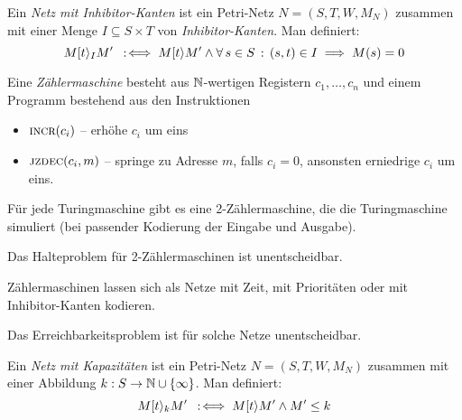 \documentclass{cheat-sheet}
\newcommand{\activeTransition}[1]{[{#1}\rangle} %
\begin{document}

\begin{defn}
  Ein \emph{Netz mit Inhibitor-Kanten} ist ein Petri-Netz $N = (S, T, W, M_N)$ zusammen mit einer Menge $I \subseteq S \times T$ von \textit{Inhibitor-Kanten}.
  Man definiert:
  \[
    M \activeTransition{t}_I M' \coloniff M \activeTransition{t} M' \wedge \fa{s \in S} (s, t) \in I \implies M(s) = 0
  \]
\end{defn}

\begin{defn}
  Eine \emph{Zählermaschine} besteht aus $\mathbb{N}$-wertigen Registern $c_1, \ldots, c_n$ und einem Programm bestehend aus den Instruktionen
  \begin{itemize}
    \item $\Call{incr}{c_i}$ -- erhöhe $c_i$ um eins
    \item $\Call{jzdec}{c_i, m}$ -- springe zu Adresse $m$, falls $c_i = 0$, ansonsten erniedrige $c_i$ um eins.
  \end{itemize}
\end{defn}

\begin{prop}
  Für jede Turingmaschine gibt es eine 2-Zählermaschine, die die Turingmaschine simuliert (bei passender Kodierung der Eingabe und Ausgabe).
\end{prop}

\begin{kor}
  Das Halteproblem für 2-Zählermaschinen ist unentscheidbar.
\end{kor}

\begin{lem}
  Zählermaschinen lassen sich als Netze mit Zeit, mit Prioritäten oder mit Inhibitor-Kanten kodieren.
\end{lem}

\begin{kor}
  Das Erreichbarkeitsproblem ist für solche Netze unentscheidbar.
\end{kor}


\begin{defn}
  Ein \emph{Netz mit Kapazitäten} ist ein Petri-Netz $N = (S, T, W, M_N)$ zusammen mit einer Abbildung $k : S \to \mathbb{N} \cup \{ \infty \}$.
  Man definiert:
  \[
    M \activeTransition{t}_k M' \coloniff M \activeTransition{t} M' \wedge M' \leq k
  \]
\end{defn}

\end{document}
